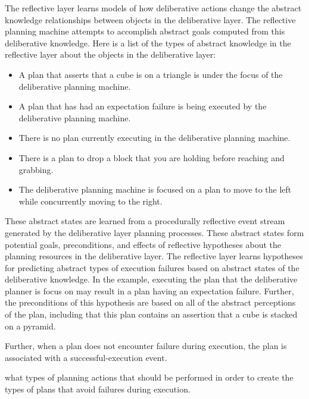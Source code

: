 The reflective layer learns models of how deliberative actions change
the abstract knowledge relationships between objects in the
deliberative layer.  The reflective planning machine attempts to
accomplish abstract goals computed from this deliberative knowledge.
Here is a list of the types of abstract knowledge in the reflective
layer about the objects in the deliberative layer:
\begin{itemize}
\item A plan that asserts that a cube is on a triangle is under the
  focus of the deliberative planning machine.
\item A plan that has had an expectation failure is being executed by
  the deliberative planning machine.
\item There is no plan currently executing in the deliberative
  planning machine.
\item There is a plan to drop a block that you are holding before
  reaching and grabbing.
\item The deliberative planning machine is focused on a plan to move
  to the left while concurrently moving to the right.
\end{itemize}
These abstract states are learned from a procedurally reflective event
stream generated by the deliberative layer planning processes.  These
abstract states form potential goals, preconditions, and effects of
reflective hypotheses about the planning resources in the deliberative
layer.  The reflective layer learns hypotheses for predicting abstract
types of execution failures based on abstract states of the
deliberative knowledge.  In the example, executing the plan that the
deliberative planner is focus on may result in a plan having an
expectation failure.  Further, the preconditions of this hypothesis
are based on all of the abstract perceptions of the plan, including
that this plan contains an assertion that a cube is stacked on a
pyramid.

Further, when a plan does not encounter failure during execution, the
plan is associated with a successful-execution event.

     what types of planning
actions that should be performed in order to create the types of plans
that avoid failures during execution.

